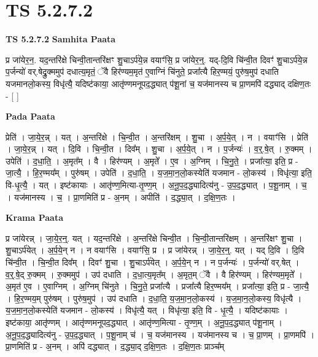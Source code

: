 \documentclass[17pt]{extarticle}
\begin{document}
\section{ TS 5.2.7.2 }

\textbf{TS 5.2.7.2 } \newline
\textbf{Samhita Paata} \newline

प्र जा॑येर॒न॒. यद॒न्तरि॑क्षे चिन्वी॒तान्तरि॑क्षꣳ शु॒चाऽर्प॑ये॒न्न वयाꣳ॑सि॒ प्र जा॑येर॒न्॒. यद्-दि॒वि चि॑न्वी॒त दिवꣳ॑ शु॒चाऽर्प॑ये॒न्न प॒र्जन्यो॑ वर्.षेद्रु॒क्ममुप॑ दधात्य॒मृतं॒ ॅवै हिर॑ण्यम॒मृत॑ ए॒वाग्निं चि॑नुते॒ प्रजा᳚त्यै हिर॒ण्मयं॒ पुरु॑ष॒मुप॑ दधाति यजमानलो॒कस्य॒ विधृ॑त्यै॒ यदिष्ट॑काया॒ आतृ॑ण्णमनूपद॒द्ध्यात् प॑शू॒नां च॒ यज॑मानस्य च प्रा॒णमपि॑ दद्ध्याद् दक्षिण॒तः - [  ] \newline

\textbf{Pada Paata} \newline

प्रेति॑ । जा॒ये॒र॒न्न् । यत् । अ॒न्तरि॑क्षे । चि॒न्वी॒त । अ॒न्तरि॑क्षम् । शु॒चा । अ॒र्प॒ये॒त् । न । वयाꣳ॑सि । प्रेति॑ । जा॒ये॒र॒न्न् । यत् । दि॒वि । चि॒न्वी॒त । दिव᳚म् । शु॒चा । अ॒र्प॒ये॒त् । न । प॒र्जन्यः॑ । व॒र्॒.षे॒त् । रु॒क्मम् । उपेति॑ । द॒धा॒ति॒ । अ॒मृत᳚म् । वै । हिर॑ण्यम् । अ॒मृते᳚ । ए॒व । अ॒ग्निम् । चि॒नु॒ते॒ । प्रजा᳚त्या॒ इति॒ प्र - जा॒त्यै॒ । हि॒र॒ण्मय᳚म् । पुरु॑षम् । उपेति॑ । द॒धा॒ति॒ । य॒ज॒मा॒न॒लो॒कस्येति॑ यजमान - लो॒कस्य॑ । विधृ॑त्या॒ इति॒ वि-धृ॒त्यै॒ । यत् । इष्ट॑कायाः । आतृ॑ण्ण॒मित्या-तृ॒ण्ण॒म् । अ॒नू॒प॒द॒द्ध्यादित्य॑नु - उ॒प॒द॒द्ध्यात् । प॒शू॒नाम् । च॒ । यज॑मानस्य । च॒ । प्रा॒णमिति॑ प्र - अ॒नम् । अपीति॑ । द॒द्ध्या॒त् । द॒क्षि॒ण॒तः ।  \newline


\textbf{Krama Paata} \newline

प्र जा॑येरन्न् । जा॒ये॒र॒न्॒. यत् । यद॒न्तरि॑क्षे । अ॒न्तरि॑क्षे चिन्वी॒त । चि॒न्वी॒तान्तरि॑क्षम् । अ॒न्तरि॑क्षꣳ शु॒चा । शु॒चाऽर्प॑येत् । अ॒र्प॒ये॒न् न । न वयाꣳ॑सि । वयाꣳ॑सि॒ प्र । प्र जा॑येरन्न् । जा॒ये॒र॒न्॒. यत् । यद् दि॒वि । दि॒वि चि॑न्वी॒त । चि॒न्वी॒त दिव᳚म् । दिवꣳ॑ शु॒चा । शु॒चाऽर्प॑येत् । अ॒र्प॒ये॒न् न । न प॒र्जन्यः॑ । प॒र्जन्यो॑ वर्.षेत् । व॒र्॒.षे॒द् रु॒क्मम् । रु॒क्ममुप॑ । उप॑ दधाति । द॒धा॒त्य॒मृत᳚म् । अ॒मृत॒म् ॅवै । वै हिर॑ण्यम् । हिर॑ण्यम॒मृते᳚ । अ॒मृत॑ ए॒व । ए॒वाग्निम् । अ॒ग्निम् चि॑नुते । चि॒नु॒ते॒ प्रजा᳚त्यै । प्रजा᳚त्यै हिर॒ण्मय᳚म् । प्रजा᳚त्या॒ इति॒ प्र - जा॒त्यै॒ । हि॒र॒ण्मय॒म् पुरु॑षम् । पुरु॑ष॒मुप॑ । उप॑ दधाति । द॒धा॒ति॒ य॒ज॒मा॒न॒लो॒कस्य॑ । य॒ज॒मा॒न॒लो॒कस्य॒ विधृ॑त्यै । य॒ज॒मा॒न॒लो॒कस्येति॑ यजमान - लो॒कस्य॑ । विधृ॑त्यै॒ यत् । विधृ॑त्या॒ इति॒ वि - धृ॒त्यै॒ । यदिष्ट॑कायाः । इष्ट॑काया॒ आतृ॑ण्णम् । आतृ॑ण्णमनूपद॒द्ध्यात् । आतृ॑ण्ण॒मित्या - तृ॒ण्ण॒म् । अ॒नू॒प॒द॒द्ध्यात् प॑शू॒नाम् । अ॒नू॒प॒द॒द्ध्यादित्य॑नु - उ॒प॒द॒द्ध्यात् । प॒शू॒नाम् च॑ । च॒ यज॑मानस्य । यज॑मानस्य च । च॒ प्रा॒णम् । प्रा॒णमपि॑ । प्रा॒णमिति॑ प्र - अ॒नम् । अपि॑ दद्ध्यात् । द॒द्ध्या॒द् द॒क्षि॒ण॒तः । द॒क्षि॒ण॒तः प्राञ्च᳚म् \newline
\end{document}
